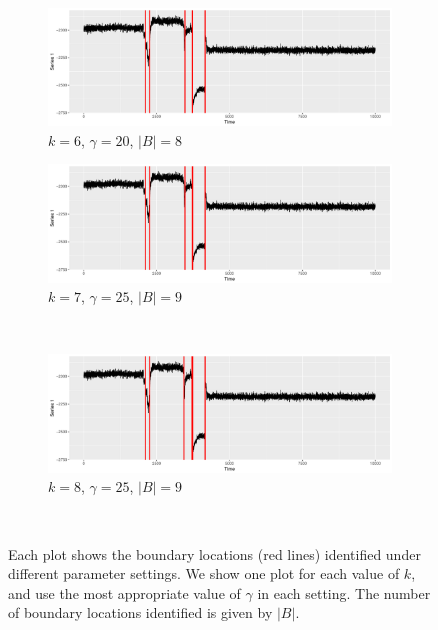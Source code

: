\begin{figure}[H]
  \begin{subfigure}{0.45\textwidth}
    \centering
    \includegraphics[width = \textwidth]{best/best_k_6_gamma_20.pdf}
    \caption{$k = 6 $, $\gamma = 20$, $|B| = 8$}
  \label{fig:best_6}
  \end{subfigure}
 \begin{subfigure}{0.45\textwidth}
    \centering
    \includegraphics[width = \textwidth]{best/best_k_7_gamma_25.pdf}
    \caption{$k = 7 $, $\gamma = 25$, $|B| = 9$}
  \label{fig:best_7}
  \end{subfigure} \\

 \begin{subfigure}{0.45\textwidth}
    \centering
    \includegraphics[width = \textwidth]{best/best_k_8_gamma_25.pdf}
    \caption{$k = 8 $, $\gamma = 25$, $|B| = 9$}
  \label{fig:best_8}
  \end{subfigure} \\
    \caption{Each plot shows the boundary locations (red lines) identified  under different parameter settings. We show one plot for each value of $k$, and use the most appropriate value of $\gamma$ in each setting. The number of boundary locations identified is given by $|B|$.}
  \label{fig:best_k_gamma}
\end{figure}

